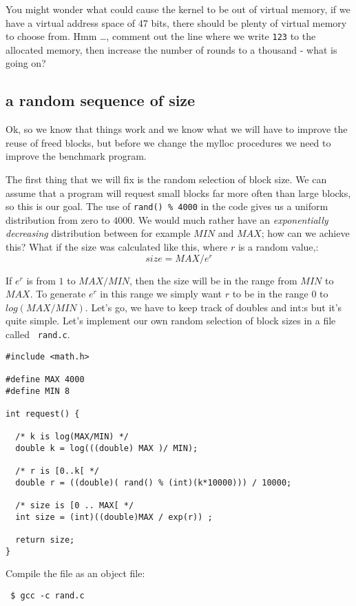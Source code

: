 \documentclass[a4paper,11pt]{article}
\begin{document}
You might wonder what could cause the kernel to be out of virtual
memory, if we have a virtual address space of 47 bits, there should be
plenty of virtual memory to choose from. Hmm \ldots, comment out the
line where we write {\tt 123} to the allocated memory, then increase
the number of rounds to a thousand - what is going on?


\subsection{a random sequence of size}

Ok, so we know that things work and we know what we will have to
improve the reuse of freed blocks, but before we change the mylloc
procedures we need to improve the benchmark program.

The first thing that we will fix is the random selection of block
size. We can assume that a program will request small blocks far more
often than large blocks, so this is our goal. The use of {\tt rand()
  \% 4000} in the code gives us a uniform distribution from zero to
$4000$. We would much rather have an {\em exponentially decreasing}
distribution between for example $MIN$ and $MAX$; how can we achieve
this? What if the size was calculated like this, where $r$ is
a random value,: $$ size = MAX / e^r$$

If $e^r$ is from $1$ to $MAX/MIN$, then the size will be in the range
from $MIN$ to $MAX$. To generate $e^r$ in this range we simply want
$r$ to be in the range $0$ to $log(MAX/MIN)$.  Let's go, we have to
keep track of doubles and int:s but it's quite simple. Let's implement
our own random selection of block sizes in a file called {\tt
  rand.c}.

\begin{lstlisting}
#include <math.h>

#define MAX 4000
#define MIN 8

int request() {

  /* k is log(MAX/MIN) */
  double k = log(((double) MAX )/ MIN);

  /* r is [0..k[ */
  double r = ((double)( rand() % (int)(k*10000))) / 10000;
  
  /* size is [0 .. MAX[ */
  int size = (int)((double)MAX / exp(r)) ;

  return size;
}
\end{lstlisting}

Compile the file as an object file:

\begin{verbatim}
 $ gcc -c rand.c
\end{verbatim}
\end{document}
